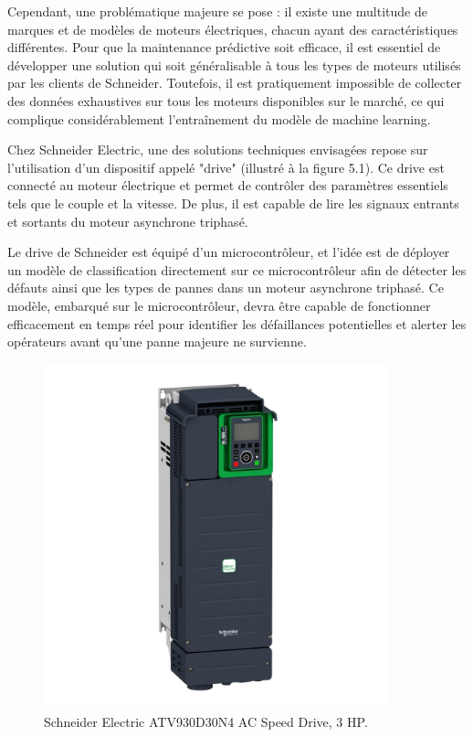 Cependant, une problématique majeure se pose : il existe une multitude de
marques et de modèles de moteurs électriques, chacun ayant des caractéristiques
différentes. Pour que la maintenance prédictive soit efficace, il est essentiel
de développer une solution qui soit généralisable à tous les types de moteurs
utilisés par les clients de Schneider. Toutefois, il est pratiquement
impossible de collecter des données exhaustives sur tous les moteurs
disponibles sur le marché, ce qui complique considérablement l'entraînement du
modèle de machine learning.

Chez Schneider Electric, une des solutions techniques envisagées repose sur
l'utilisation d'un dispositif appelé "drive" (illustré à la figure 5.1). Ce
drive est connecté au moteur électrique et permet de contrôler des paramètres
essentiels tels que le couple et la vitesse. De plus, il est capable de lire
les signaux entrants et sortants du moteur asynchrone triphasé.

Le drive de Schneider est équipé d'un microcontrôleur, et l'idée est de
déployer un modèle de classification directement sur ce microcontrôleur afin de
détecter les défauts ainsi que les types de pannes dans un moteur asynchrone
triphasé. Ce modèle, embarqué sur le microcontrôleur, devra être capable de
fonctionner efficacement en temps réel pour identifier les défaillances
potentielles et alerter les opérateurs avant qu'une panne majeure ne survienne.

\begin{figure}[hbt!]
  \centering
  \includegraphics[width=10cm]{images_pfe/drive_se.jpg}
  \caption{Schneider Electric ATV930D30N4 AC Speed Drive, 3 HP.}
  \label{fig:drive}
\end{figure}
\FloatBarrier


